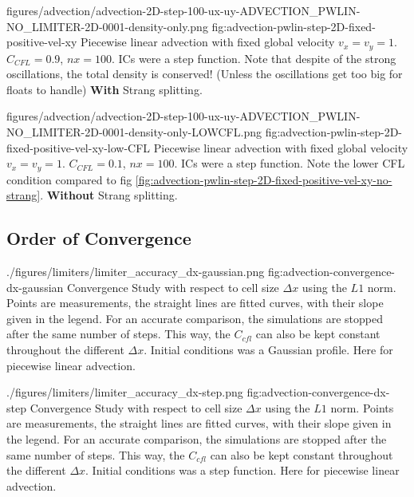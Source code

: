\quickfigcap
	{figures/advection/advection-2D-step-100-ux-uy-ADVECTION_PWLIN-NO_LIMITER-2D-0001-density-only.png}
	{fig:advection-pwlin-step-2D-fixed-positive-vel-xy}
	{	
		Piecewise linear advection with fixed global velocity $v_x = v_y = 1$. $C_{CFL} = 0.9$, $nx = 100$. 
		ICs were a step function. 
		Note that despite of the strong oscillations, the total density is conserved! 
		(Unless the oscillations get too big for floats to handle)
		\textbf{With} Strang splitting.
	}










\quickfigcap
	{figures/advection/advection-2D-step-100-ux-uy-ADVECTION_PWLIN-NO_LIMITER-2D-0001-density-only-LOWCFL.png}
	{fig:advection-pwlin-step-2D-fixed-positive-vel-xy-low-CFL}
	{
		Piecewise linear advection with fixed global velocity $v_x = v_y = 1$. 
		$C_{CFL} = 0.1$, $nx = 100$. 
		ICs were a step function. 
		Note the lower CFL condition compared to fig \ref{fig:advection-pwlin-step-2D-fixed-positive-vel-xy-no-strang}.
		\textbf{Without} Strang splitting.
	}

















\subsection{Order of Convergence}



\quickfigcap
	{./figures/limiters/limiter_accuracy_dx-gaussian.png}
	{fig:advection-convergence-dx-gaussian}
	{
		Convergence Study with respect to cell size $\Delta x$ using the $L1$ norm.
		Points are measurements, the straight lines are fitted curves, with their slope given in the legend.
		For an accurate comparison, the simulations are stopped after the same number of steps.
		This way, the $C_{cfl}$ can also be kept constant throughout the different $\Delta x$.
		Initial conditions was a Gaussian profile.
		Here for piecewise linear advection.
	}

\quickfigcap
	{./figures/limiters/limiter_accuracy_dx-step.png}
	{fig:advection-convergence-dx-step}
	{
		Convergence Study with respect to cell size $\Delta x$ using the $L1$ norm.
		Points are measurements, the straight lines are fitted curves, with their slope given in the legend.
		For an accurate comparison, the simulations are stopped after the same number of steps.
		This way, the $C_{cfl}$ can also be kept constant throughout the different $\Delta x$.
		Initial conditions was a step function.
		Here for piecewise linear advection.
	}
	



